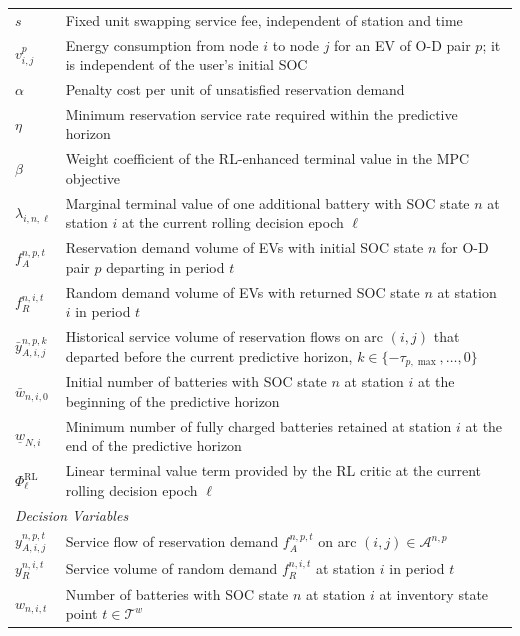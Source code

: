 \documentclass[12pt,hyperref,a4paper,UTF8]{ctexart}
\begin{document}
\begin{table}[!htbp]
\begin{tabular}{@{}lp{13cm}@{}}
    $s$ & Fixed unit swapping service fee, independent of station and time \\
    $v^{p}_{i,j}$ & Energy consumption from node $i$ to node $j$ for an EV of O-D pair $p$; it is independent of the user's initial SOC \\
    $\alpha$ & Penalty cost per unit of unsatisfied reservation demand \\
    $\eta$ & Minimum reservation service rate required within the predictive horizon \\
    $\beta$ & Weight coefficient of the RL-enhanced terminal value in the MPC objective \\
    $\lambda_{i,n,\ell}$ & Marginal terminal value of one additional battery with SOC state $n$ at station $i$ at the current rolling decision epoch $\ell$ \\
    $f_{A}^{n,p,t}$ & Reservation demand volume of EVs with initial SOC state $n$ for O-D pair $p$ departing in period $t$ \\
    $f_{R}^{n,i,t}$ & Random demand volume of EVs with returned SOC state $n$ at station $i$ in period $t$ \\
    $\bar{y}_{A,i,j}^{n,p,k}$ & Historical service volume of reservation flows on arc $(i,j)$ that departed before the current predictive horizon, $k\in\{-\tau_{p,\max},\dots,0\}$ \\
    $\bar{w}_{n,i,0}$ & Initial number of batteries with SOC state $n$ at station $i$ at the beginning of the predictive horizon \\
    $\underline{w}_{N,i}$ & Minimum number of fully charged batteries retained at station $i$ at the end of the predictive horizon \\
    $\Phi^{\mathrm{RL}}_{\ell}$ & Linear terminal value term provided by the RL critic at the current rolling decision epoch $\ell$ \\
    \midrule
    \multicolumn{2}{l}{\textit{Decision Variables}} \\
    $y_{A,i,j}^{n,p,t}$ & Service flow of reservation demand $f_{A}^{n,p,t}$ on arc $(i,j)\in\mathcal{A}^{n,p}$ \\
    $y_{R}^{n,i,t}$ & Service volume of random demand $f_{R}^{n,i,t}$ at station $i$ in period $t$ \\
    $w_{n,i,t}$ & Number of batteries with SOC state $n$ at station $i$ at inventory state point $t\in\mathcal{T}^{w}$ \\
    \bottomrule
  \end{tabular}
\end{table}
\end{document}
